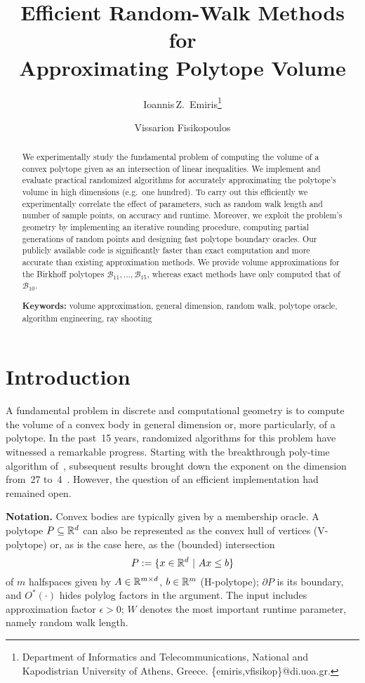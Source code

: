 \documentclass[11pt,a4paper]{article}
\title{Efficient Random-Walk Methods for \\ Approximating Polytope Volume}
\author{Ioannis\,Z.~Emiris\thanks{
Department of Informatics and Telecommunications,
National and Kapodistrian University of Athens, Greece. 
\{emiris,vfisikop\}@di.uoa.gr.}
\and Vissarion Fisikopoulos\footnotemark[1]}
\date{}
\def\B{{\mathcal B}} \def\E{{\mathcal E}}
\begin{document}
\maketitle
\thispagestyle{empty}

\begin{abstract} 
We experimentally study the fundamental problem of computing the volume of a convex polytope given as an intersection of linear inequalities. 
We implement and evaluate practical randomized algorithms for accurately
approximating the polytope's volume in high dimensions (e.g.\ one hundred).  
To carry out this efficiently we experimentally correlate the effect
of parameters, such as random walk length and number of sample points, on accuracy and runtime.
Moreover, we exploit the problem's geometry by implementing an iterative rounding procedure, computing partial generations of random points and designing fast polytope boundary oracles. 
Our publicly available code is significantly faster than exact computation and more accurate
than existing approximation methods. We provide volume approximations for the Birkhoff polytopes $\B_{11},\dots, \B_{15}$, whereas exact methods have only computed that of $\B_{10}$. 

\medskip

{\bf Keywords:} volume approximation, general dimension, random walk,
polytope oracle, algorithm engineering, ray shooting 
\end{abstract}

\newpage
\setcounter{page}{1}
\section{Introduction}\label{sec:intro}

A fundamental problem in discrete and computational geometry is
to compute the volume of a convex body in general dimension or,
more particularly, of a polytope.
In the past~15 years, randomized algorithms for this problem have
witnessed a remarkable progress.
Starting with the breakthrough poly-time algorithm
of~\cite{DyerFrKa91}, subsequent results brought down
the exponent on the dimension from~27 to~4~\cite{LovaszVemp06vol}.
However, the question of an efficient implementation had remained open.  

\textbf{Notation.}
Convex bodies are typically given by a membership oracle.
A polytope $P\subseteq{\mathbb R}^d$ can also be represented as the convex hull
of vertices (V-polytope) or, as is the case here, as the (bounded) intersection
$$P:= \{x\in\RR^d \ |\ Ax\leq b\}$$ of $m$ halfspaces given by
$A\in{\mathbb R}^{m\times d}$, $b\in{\mathbb R}^m$ (H-polytope);
$\partial P$ is its boundary, and
$O^*(\cdot)$ hides polylog factors in the argument.
The input includes approximation factor $\epsilon>0$;
$W$ denotes the most important runtime parameter, namely random walk length.
\end{document}
